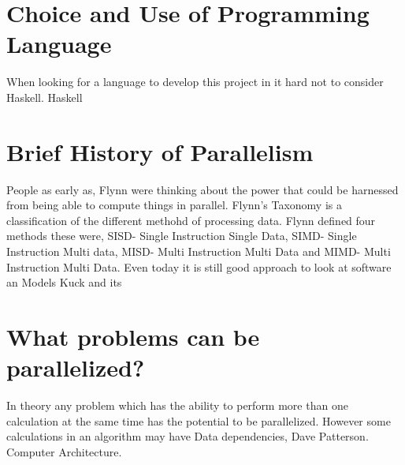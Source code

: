 \documentclass{report}
\begin{document}
\section{Choice and Use of Programming Language}

When looking for a language to develop this project in it hard not to consider Haskell. Haskell

\section {Brief History of Parallelism}
People as early as, Flynn were thinking about the power that could be harnessed from being able to compute things in parallel.
Flynn's Taxonomy is a classification of the different methohd of processing data. Flynn defined four methods these were, SISD- Single Instruction Single Data, SIMD- Single Instruction Multi data, MISD- Multi Instruction Multi Data and MIMD- Multi Instruction Multi Data. Even today it is still good approach to look at software an
Models Kuck and its

\section {What problems can be parallelized?}
In theory any problem which has the ability to perform more than one calculation at the same time has the potential to be parallelized. However some calculations in an algorithm may have Data dependencies, 
Dave Patterson. Computer Architecture.
\end{document}
